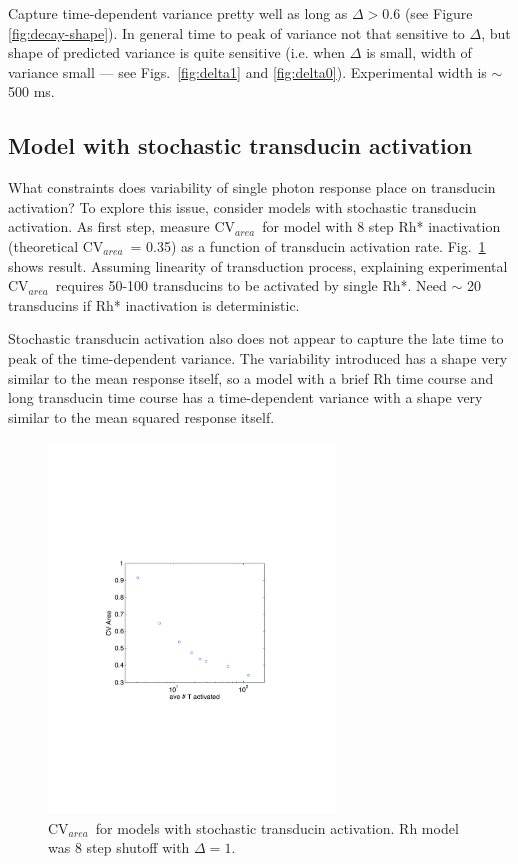 \documentclass[12pt]{article}
\def\CVArea{CV$_{area}$~}
\begin{document}
Capture time-dependent variance pretty well as long as $\Delta > 0.6$ (see Figure \ref{fig:decay-shape}).  In general time to peak of variance not that sensitive to $\Delta$, but shape of predicted variance is quite sensitive (i.e. when $\Delta$ is small, width of variance small --- see Figs.~\ref{fig:delta1} and \ref{fig:delta0}).  Experimental width is $\sim$ 500 ms.

\subsection{Model with stochastic transducin activation}

What constraints does variability of single photon response place on transducin activation?  To explore this issue, consider models with stochastic transducin activation.  As first step, measure \CVArea for model with 8 step Rh* inactivation (theoretical \CVArea = 0.35) as a function of transducin activation rate.  Fig.~\ref{fig:transducin} shows result.  Assuming linearity of transduction process, explaining experimental \CVArea requires 50-100 transducins to be activated by single Rh*.  Need $\sim$ 20 transducins if Rh* inactivation is deterministic.

Stochastic transducin activation also does not appear to capture the late time to peak of the time-dependent variance.  The variability introduced has a shape very similar to the mean response itself, so a model with a brief Rh time course and long transducin time course has a time-dependent variance with a shape very similar to the mean squared response itself.

\begin{figure}[h]
\begin{center}
\includegraphics[width=3in]{transducin.pdf}
\caption{\CVArea for models with stochastic transducin activation.  Rh model was 8 step shutoff with $\Delta = 1$.}
\label{fig:transducin}
\end{center}
\end{figure}
\end{document}
